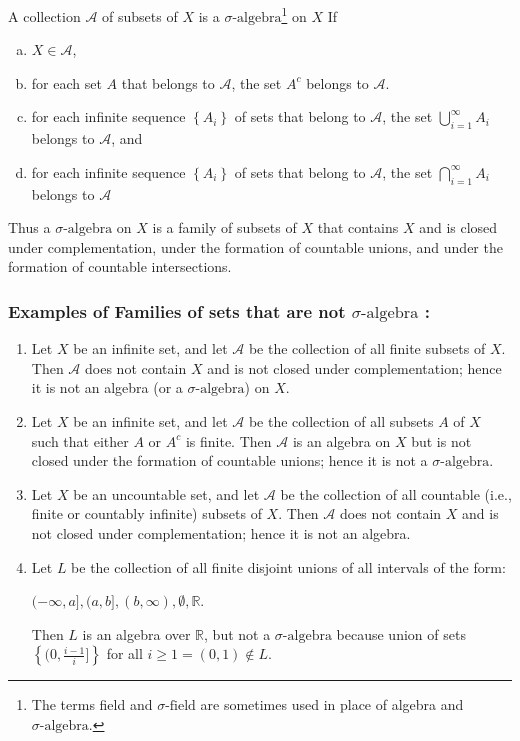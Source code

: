 \documentclass[12pt, a4paper]{article} %
\begin{document}
A collection $\mathscr{A}$ of subsets of $X$ is a $\sigma\mbox{-algebra}$\footnote{The terms field and $\sigma\mbox{-field}$ are sometimes used in place of algebra and $\sigma\mbox{-algebra}$.} on $X$ If

\begin{enumerate}[a)]
    \item $X \in \mathscr{A}$,
    \item for each set $A$ that belongs to $\mathscr{A}$, the set $A^c$ belongs to $\mathscr{A}$.
    \item  for each infinite sequence $\left\{A_i\right\}$ of sets that belong to $\mathscr{A}$, the set $\displaystyle \bigcup_{i=1}^{\infty} A_i$ belongs to $\mathscr{A}$, and
    \item for each infinite sequence $\left\{A_i\right\}$ of sets that belong to $\mathscr{A}$, the set $\displaystyle \bigcap_{i=1}^{\infty} A_i$ belongs to $\mathscr{A}$
\end{enumerate}
Thus a $\sigma\mbox{-algebra}$ on $X$ is a family of subsets of $X$ that contains $X$ and is closed under complementation, under the formation of countable unions, and under the formation of countable intersections.


\subsubsection*{ Examples of Families of sets that are not $\sigma\mbox{-algebra}$ :}

\begin{enumerate}[1)]
    \item Let $X$ be an infinite set, and let $\mathscr{A}$ be the collection of all finite subsets of $X$.
    Then $\mathscr{A}$ does not contain $X$ and is not closed under complementation; hence it is not an algebra (or a $\sigma\mbox{-algebra}$) on $X$.
    \item  Let $X$ be an infinite set, and let $\mathscr{A}$ be the collection of all subsets $A$ of $X$ such that either $A$ or $A^c$ is finite. Then $\mathscr{A}$ is an algebra on $X$  but is not closed under the formation of countable unions; hence it is not a $\sigma\mbox{-algebra}$.
    \item Let $X$ be an uncountable set, and let $\mathscr{A}$ be the collection of all countable (i.e., finite or countably infinite) subsets of $X$. Then $\mathscr{A}$ does not contain $X$ and is not closed under complementation; hence it is not an algebra.
    \item Let $L$ be the collection of all finite disjoint unions of all intervals of the form:

    $(-\infty, a], (a, b], (b, \infty), \emptyset, \mathbb{R}$.
    
    Then $L$ is an algebra over $\mathbb{R}$, but not a $\sigma\mbox{-algebra}$ because union of sets $\displaystyle \left\{(0,\frac{i-1}{i}]\right\}$ for all $\displaystyle i \ge 1 = (0, 1) \notin L $.
\end{enumerate}
\end{document}
